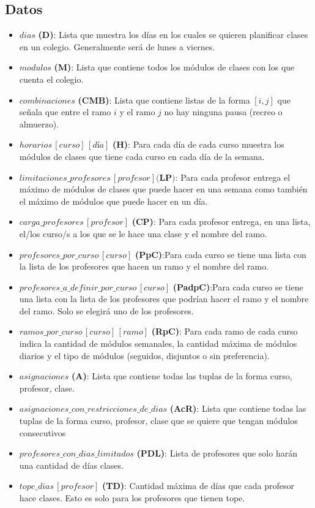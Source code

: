 \documentclass[letterpaper]{article}
\begin{document}
\subsection{Datos}
\begin{itemize}
    \item $dias$ \textbf{(D)}: Lista que muestra los días en los cuales se quieren planificar clases en un colegio. Generalmente será de lunes a viernes.
    \item $modulos$ \textbf{(M)}: Lista que contiene todos los módulos de clases con los que cuenta el colegio.
    \item $combinaciones$ \textbf{(CMB)}: Lista que contiene listas de la forma $[i,j]$ que señala que entre el ramo $i$ y el ramo $j$ no hay ninguna pausa (recreo o almuerzo).
    \item $horarios\,[curso]\,[día]$ \textbf{(H)}: Para cada día de cada curso muestra los módulos de clases que tiene cada curso en cada día de la semana.
    \item $limitaciones\_profesores\,[profesor] \textbf{(LP)}$: Para cada profesor entrega el máximo de módulos de clases que puede hacer en una semana como también el máximo de módulos que puede hacer en un día.
    \item $carga\_profesores\,[profesor]$ \textbf{(CP)}: Para cada profesor entrega, en una lista, el/los curso/s a los que se le hace una clase y el nombre del ramo.
    \item $profesores\_por\_curso\,[curso]$ \textbf{(PpC)}:Para cada curso se tiene una lista con la lista de los profesores que hacen un ramo y el nombre del ramo.
    \item $profesores\_a\_definir\_por\_curso\,[curso]$ \textbf{(PadpC)}:Para cada curso se tiene una lista con la lista de los profesores que podrían hacer el ramo y el nombre del ramo. Solo se elegirá uno de los profesores.
    \item $ramos\_por\_curso \, [curso] \, [ramo]$ \textbf{(RpC)}: Para cada ramo de cada curso indica la cantidad de módulos semanales, la cantidad máxima de módulos diarios y el tipo de módulos (seguidos, disjuntos o sin preferencia).
    \item $asignaciones$ \textbf{(A)}: Lista que contiene todas las tuplas de la forma curso, profesor, clase.
    \item $asignaciones\_con\_restricciones\_de\_dias$ \textbf{(AcR)}: Lista que contiene todas las tuplas de la forma curso, profesor, clase que se quiere que tengan módulos consecutivos
    \item $profesores\_con\_dias\_limitados$ \textbf{(PDL)}: Lista de profesores que solo harán una cantidad de días clases.
    \item $tope\_dias\,[profesor]$ \textbf{(TD)}: Cantidad máxima de días que cada profesor hace clases. Esto es solo para los profesores que tienen tope.
\end{itemize}
\end{document}
